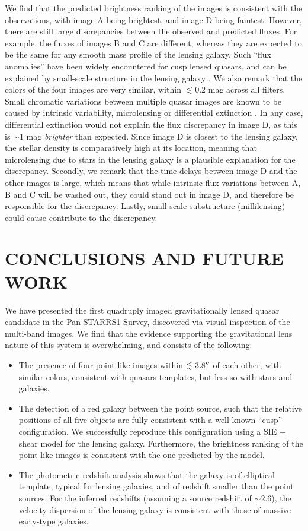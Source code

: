 \documentclass[manuscript]{aastex}
\begin{document}
We find that the predicted brightness ranking of the images is consistent with the observations, with image A being brightest, and image D being faintest. However, there are still large discrepancies between the observed and predicted fluxes. For example, the fluxes of images B and C are different, whereas they are expected to be the same for any smooth mass profile of the lensing galaxy. Such ``flux anomalies'' have been widely encountered for cusp lensed quasars, and can be explained by small-scale structure in the lensing galaxy \citep[e.g.,][]{kee03}. We also remark that the colors of the four images are very similar, within $\lesssim 0.2$ mag across all filters. Small chromatic variations between multiple quasar images are known to be caused by intrinsic variability, microlensing or differential extinction \citep{yon08}. In any case, differential extinction would not explain the flux discrepancy in image D, as this is $\sim1$ mag \emph{brighter} than expected. Since image D is closest to the lensing galaxy, the stellar density is comparatively high at its location, meaning that microlensing due to stars in the lensing galaxy is a plausible explanation for the discrepancy. Secondly, we remark that the time delays between image D and the other images is large, which means that while intrinsic flux variations between A, B and C will be washed out, they could stand out in image D, and therefore be responsible for the discrepancy. Lastly, small-scale substructure (millilensing) could cause contribute to the discrepancy.


\section{CONCLUSIONS AND FUTURE WORK}

We have presented the first quadruply imaged gravitationally lensed quasar candidate in the Pan-STARRS1 Survey, discovered via visual inspection of the multi-band images. We find that the evidence supporting the gravitational lens nature of this system is overwhelming, and consists of the following:

\begin{itemize}
\item The presence of four point-like images within $\lesssim 3.8\mbox{$^{\prime\prime}$}$ of each other, with similar colors, consistent with quasars templates, but less so with stars and galaxies.
\item The detection of a red galaxy between the point source, such that the relative positions of all five objects are fully consistent with a well-known ``cusp'' configuration. We successfully reproduce this configuration using a SIE + shear model for the lensing galaxy. Furthermore, the brightness ranking of the point-like images is consistent with the one predicted by the model.
 \item The photometric redshift analysis shows that the galaxy is of elliptical template, typical for lensing galaxies, and of redshift smaller than the point sources. For the inferred redshifts (assuming a source redshift of $\sim2.6$), the velocity dispersion of the lensing galaxy is consistent with those of massive early-type galaxies.
\end{itemize}
\end{document}

